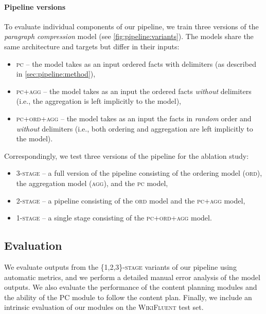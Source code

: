 \paragraph{Pipeline versions} To evaluate individual components of our pipeline, we train three versions of the \textit{paragraph compression} model (see \autoref{fig:pipeline:variants}). The models share the same architecture and targets but differ in their inputs:
\begin{itemize}
    \item \textsc{\ac{pc}} -- the model takes as an input ordered facts with delimiters (as described in \autoref{sec:pipeline:method}),
    \item \textsc{\ac{pc}+agg} -- the model takes as an input the ordered facts \textit{without} delimiters (i.e., the aggregation is left implicitly to the model),
    \item \textsc{\ac{pc}+ord+agg} -- the model takes as an input the facts in \textit{random} order and \textit{without} delimiters (i.e., both ordering and aggregation are left implicitly to the model).
\end{itemize}
Correspondingly, we test three versions of the pipeline for the ablation study:
\begin{itemize}
    \item \textsc{3-stage} -- a full version of the pipeline consisting of the ordering model (\textsc{ord}), the aggregation model (\textsc{agg}), and the \textsc{\ac{pc}} model,
    \item \textsc{2-stage} -- a pipeline consisting of the \textsc{ord} model and the \textsc{\ac{pc}+agg} model,
    \item \textsc{1-stage} -- a single stage consisting of the \textsc{\ac{pc}+ord+agg} model.
\end{itemize}


\subsection{Evaluation}
\label{sec:pipeline:eval}
We evaluate outputs from the \textsc{\{1,2,3\}-stage} variants of our pipeline using automatic metrics, and we perform a detailed manual error analysis of the model outputs. We also evaluate the performance of the content planning modules and the ability of the PC module to follow the content plan. Finally, we include an intrinsic evaluation of our modules on the \textsc{WikiFluent} test set.

